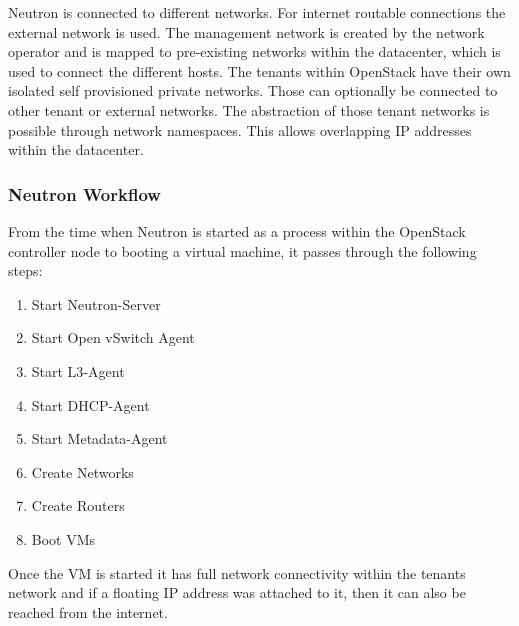 Neutron is connected to different networks. For internet routable connections the external network is used. The management network is created by the network operator and is mapped to pre-existing networks within the datacenter, which is used to connect the different hosts. The tenants within OpenStack have their own isolated self provisioned private networks. Those can optionally be connected to other tenant or external networks. The abstraction of those tenant networks is possible through network namespaces. This allows overlapping IP addresses within the datacenter.


\subsubsection{Neutron Workflow}

From the time when Neutron is started as a process within the OpenStack controller node to booting a virtual machine, it passes through the following steps:

\begin{enumerate}
\item Start Neutron-Server
\item Start Open vSwitch Agent
\item Start L3-Agent
\item Start DHCP-Agent
\item Start Metadata-Agent
\item Create Networks
\item Create Routers
\item Boot VMs
\end{enumerate}

Once the VM is started it has full network connectivity within the tenants network and if a floating IP address was attached to it, then it can also be reached from the internet.

%
%



